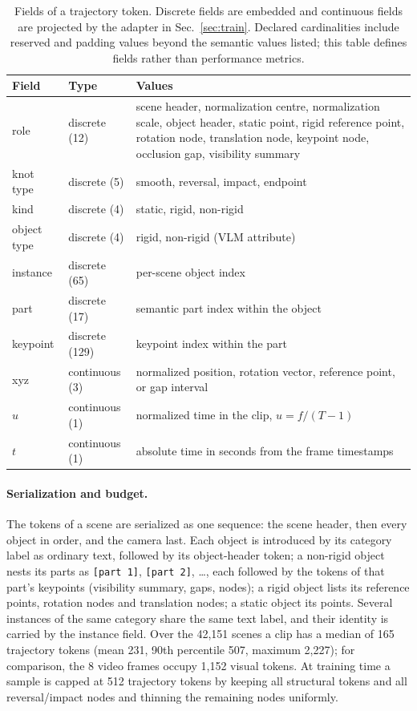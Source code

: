 \begin{table}[t]
\caption{Fields of a trajectory token. Discrete fields are embedded and continuous fields are projected by the adapter in Sec.~\ref{sec:train}. Declared cardinalities include reserved and padding values beyond the semantic values listed; this table defines fields rather than performance metrics.}
\label{tab:token-fields}
\begin{center}
\small
\begin{tabular}{llp{7.3cm}}
\toprule
\textbf{Field} & \textbf{Type} & \textbf{Values} \\
\midrule
role & discrete (12) & scene header, normalization centre, normalization scale, object header, static point, rigid reference point, rotation node, translation node, keypoint node, occlusion gap, visibility summary \\
knot type & discrete (5) & smooth, reversal, impact, endpoint \\
kind & discrete (4) & static, rigid, non-rigid \\
object type & discrete (4) & rigid, non-rigid (VLM attribute) \\
instance & discrete (65) & per-scene object index \\
part & discrete (17) & semantic part index within the object \\
keypoint & discrete (129) & keypoint index within the part \\
\midrule
xyz & continuous (3) & normalized position, rotation vector, reference point, or gap interval \\
$u$ & continuous (1) & normalized time in the clip, $u=f/(T-1)$ \\
$t$ & continuous (1) & absolute time in seconds from the frame timestamps \\
\bottomrule
\end{tabular}
\end{center}
\end{table}

\paragraph{Serialization and budget.}
The tokens of a scene are serialized as one sequence: the scene header, then every object in order, and the camera last.
Each object is introduced by its category label as ordinary text, followed by its object-header token; a non-rigid object nests its parts as \texttt{[part 1]}, \texttt{[part 2]}, \dots, each followed by the tokens of that part's keypoints (visibility summary, gaps, nodes); a rigid object lists its reference points, rotation nodes and translation nodes; a static object its points.
Several instances of the same category share the same text label, and their identity is carried by the instance field.
Over the 42,151 scenes a clip has a median of 165 trajectory tokens (mean 231, 90th percentile 507, maximum 2,227); for comparison, the 8 video frames occupy 1,152 visual tokens.
At training time a sample is capped at 512 trajectory tokens by keeping all structural tokens and all reversal/impact nodes and thinning the remaining nodes uniformly.


